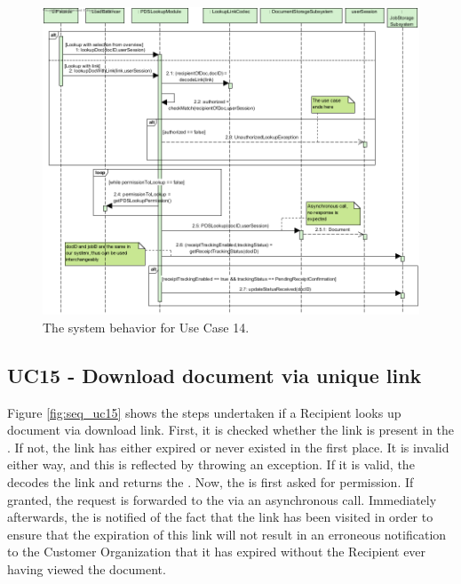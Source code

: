 \begin{figure}[!htp]
    \centering
    \includegraphics[width=\textwidth]{figures/UC14 - Consult document in PDS.png}
    \caption{The system behavior for Use Case 14.
        }\label{fig:seq_uc14}
\end{figure}

\subsection{UC15 - Download document via unique link}
Figure \ref{fig:seq_uc15} shows the steps undertaken if a Recipient looks up document via download link. First, it is checked whether the link is present in the . If not, the link has either expired or never existed in the first place. It is invalid either way, and this is reflected by throwing an exception. If it is valid, the  decodes the link and returns the . Now, the  is first asked for permission. If granted, the request is forwarded to the  via an asynchronous call. Immediately afterwards, the  is notified of the fact that the link has been visited in order to ensure that the expiration of this link will not result in an erroneous notification to the Customer Organization that it has expired without the Recipient ever having viewed the document.


